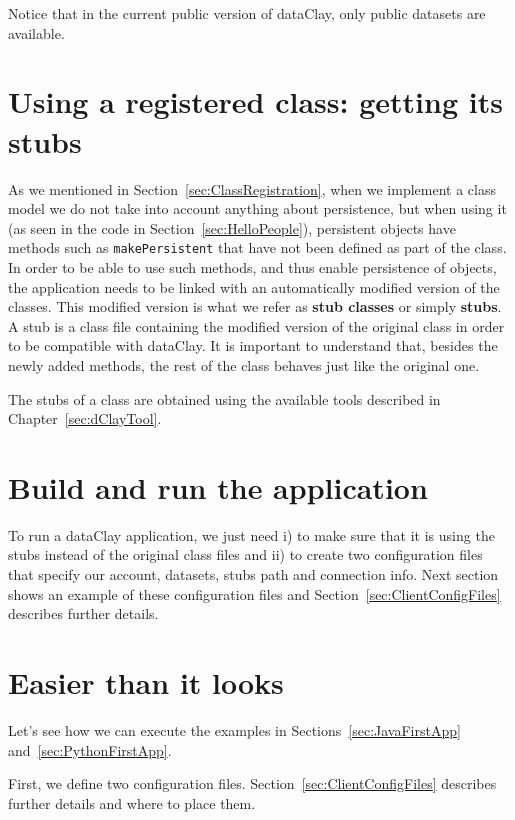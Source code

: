 Notice that in the current public version of dataClay, only public datasets are available.

\section{Using a registered class: getting its stubs}

As we mentioned in Section~\ref{sec:ClassRegistration}, when we implement a class model we do not take into account anything about persistence, but when using it (as seen in the code in Section~\ref{sec:HelloPeople}), persistent objects have methods such as \texttt{makePersistent} that have not been defined as part of the class. In order to be able to use such methods, and thus enable persistence of objects, the application needs to be linked with an automatically modified version of the classes. This modified version is what we refer as {\bf stub classes} or simply {\bf stubs}. A stub is a class file containing the modified version of the original class in order to be compatible with dataClay. It is important to understand that, besides the newly added methods, the rest of the class behaves just like the original one. 

The stubs of a class are obtained using the available tools described in Chapter~\ref{sec:dClayTool}.

\section{Build and run the application}

To run a dataClay application, we just need i) to make sure that it is using the stubs instead of the original class files and ii) to create two configuration files that specify our account, datasets, stubs path and connection info. Next section shows an example of these configuration files and Section~\ref{sec:ClientConfigFiles} describes further details.

\section{Easier than it looks}

Let's see how we can execute the examples in Sections~\ref{sec:JavaFirstApp} and~\ref{sec:PythonFirstApp}.

First, we define two configuration files. Section~\ref{sec:ClientConfigFiles} describes further details and where to place them.

